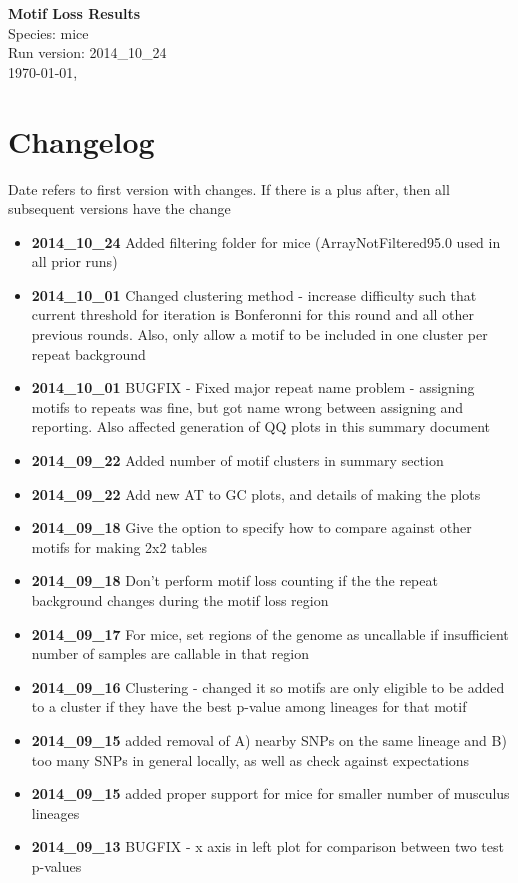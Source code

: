 \documentclass{article}\usepackage[]{graphicx}\usepackage[]{color}
\begin{document}
\begin{flushleft}
{\Large \textbf{Motif Loss Results}}\\
Species: mice\\
Run version: 2014\_10\_24\\
\today, \currenttime\\
\end{flushleft}


\section*{Changelog}
Date refers to first version with changes. If there is a plus after, then all subsequent versions have the change
\begin{itemize}
\item \textbf{2014\_10\_24} Added filtering folder for mice (ArrayNotFiltered95.0 used in all prior runs)
\item \textbf{2014\_10\_01} Changed clustering method - increase difficulty such that current threshold for iteration is Bonferonni for this round and all other previous rounds. Also, only allow a motif to be included in one cluster per repeat background
\item \textbf{2014\_10\_01} BUGFIX - Fixed major repeat name problem - assigning motifs to repeats was fine, but got name wrong between assigning and reporting. Also affected generation of QQ plots in this summary document
\item \textbf{2014\_09\_22} Added number of motif clusters in summary section  
\item \textbf{2014\_09\_22} Add new AT  to GC plots, and details of making the plots
\item \textbf{2014\_09\_18} Give the option to specify how to compare against other motifs for making 2x2 tables
\item \textbf{2014\_09\_18} Don't perform motif loss counting if the the repeat background changes during the motif loss region
\item \textbf{2014\_09\_17} For mice, set regions of the genome as uncallable if insufficient number of samples are callable in that region
\item \textbf{2014\_09\_16} Clustering - changed it so motifs are only eligible to be added to a cluster if they have the best p-value among lineages for that motif
\item \textbf{2014\_09\_15} added removal of A) nearby SNPs on the same lineage and B) too many SNPs in general locally, as well as check against expectations
\item \textbf{2014\_09\_15} added proper support for mice for smaller number of musculus lineages
\item \textbf{2014\_09\_13} BUGFIX - x axis in left plot for comparison between two test p-values
\end{itemize}
\end{document}
